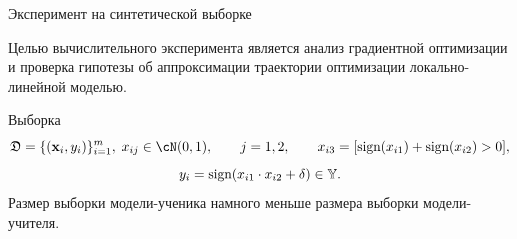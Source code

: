 \documentclass[10pt, aspectratio=169]{beamer}
\begin{document}



\begin{frame}{Эксперимент на синтетической выборке}

Целью вычислительного эксперимента является анализ градиентной оптимизации и проверка гипотезы об аппроксимации траектории оптимизации локально-линейной моделью.

\begin{block}{Выборка}
\vspace{-0.5 cm}
$$\fD = \{(\bx_i, y_i)\}_{i=1}^{m},\; x_{ij} \in \cN(0, 1),\qquad j=1, 2, \qquad x_{i3} = [\text{sign}(x_{i1})+\text{sign}(x_{i2})>0],$$
$$y_i = \text{sign}(x_{i1} \cdot x_{i2}+\delta) \in \mathbb{Y}.$$
Размер выборки модели-ученика намного меньше размера выборки модели-учителя.
\end{block}
\begin{figure}
    \fontsize{5}{5}\selectfont
    \begin{minipage}[h]{0.3\linewidth}
    \end{minipage}
    \begin{minipage}[h]{0.3\linewidth}
    \center{
}
\end{minipage}
\end{figure}
\end{frame}
\end{document}

